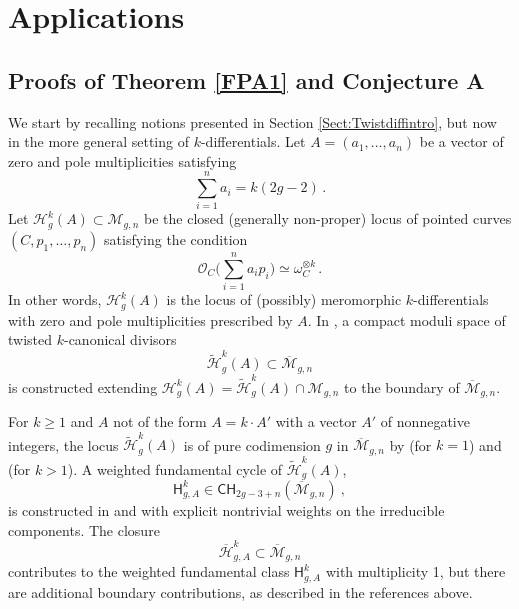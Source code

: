 \documentclass[a4paper,12pt]{article} %
\newcommand{\ca}[1]{{\mathcal{#1}}}
\def\oM{\overline{\mathcal{M}}}
\def\HH{\mathcal{H}}
\theoremstyle{definition}
\theoremstyle{plain}%
\begin{document}



\section{Applications}\label{sec:applications}
\subsection{Proofs of Theorem \ref{FPA1} and Conjecture A} \label{Sect:ProofConjA}
We start by recalling notions presented in Section \ref{Sect:Twistdiffintro}, but now in the more general setting of $k$-differentials.
Let $A=(a_1,\ldots,a_n)$ be a vector of zero and pole multiplicities
satisfying
$$\sum_{i=1}^n a_i= k(2g-2)\, .$$
Let $\HH^k_g(A) \subset \mathcal{M}_{g,n}$ be the closed (generally non-proper) locus 
of pointed curves $(C,p_1,\ldots,p_n)$ satisfying the condition
$$\mathcal{O}_C\Big(\sum_{i=1}^n a_i p_i\Big) \simeq \omega_C^{\otimes k}\, .$$
In other words, $\HH^k_g(A)$ is the locus of (possibly) meromorphic $k$-differentials
with zero and pole multiplicities prescribed by $A$.
In \cite{Farkas2016The-moduli-spac}, a compact moduli space of twisted $k$-canonical divisors
$$\widetilde{\HH}^k_g(A) \subset \overline{\mathcal{M}}_{g,n}$$
is constructed extending $\HH^k_g(A) = \widetilde{\HH}^k_g(A) \cap \mathcal{M}_{g,n} $ to the boundary of $\overline{\mathcal{M}}_{g,n}$.

For $k \geq 1$ and $A$ not of the form $A = k \cdot A'$ with a vector $A'$ of nonnegative integers, the locus
$\widetilde{\HH}^k_g(A)$ is of pure codimension $g$ in
$\overline{\mathcal{M}}_{g,n}$ by \cite[Theorem 3]{Farkas2016The-moduli-spac} (for $k=1$) and \cite[Theorem 1.1]{Schmitt2016Dimension-theor} (for $k>1$). 
A weighted fundamental cycle of $\widetilde{\HH}^k_g(A)$, 
\begin{equation}\label{wwww4k}
\mathsf{H}^k_{g,A}\in \mathsf{CH}_{2g-3+n}(\oM_{g,n})\ ,
\end{equation}
is constructed in
\cite[Appendix A]{Farkas2016The-moduli-spac} and \cite[Section 3.1]{Schmitt2016Dimension-theor} with explicit nontrivial 
weights on the irreducible components.
The closure
$$\overline{\HH}^k_{g,A}\subset \oM_{g,n}$$
contributes to the weighted fundamental class $\mathsf{H}^k_{g,A}$ with
multiplicity 1, but there are additional boundary contributions, as described in the references above.
\end{document}
